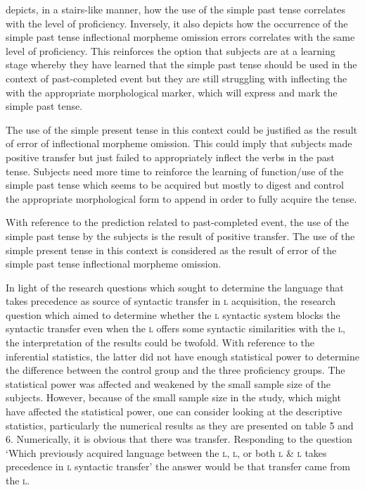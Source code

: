 \documentclass[output=paper,
modfonts
]{langscibook}
\begin{document}
 depicts, in a stairs-like manner, how the use of the simple past tense correlates with the level of proficiency. Inversely, it also depicts how the occurrence of the simple past tense inflectional morpheme omission errors correlates with the same level of proficiency.   This reinforces the option that subjects are at a learning stage whereby they have learned that the simple past tense should be used in the context of past-completed event but they are still struggling with inflecting the  with the appropriate morphological marker, which will express and mark the simple past tense.  

The use of the simple present tense in this context could be justified as the result of error of inflectional morpheme omission. This could imply that subjects made positive transfer but just failed to appropriately inflect the verbs in the past tense. Subjects need more time to reinforce the learning of function/use of the simple past tense which seems to be acquired but mostly to digest and control the appropriate morphological form to append in order to fully acquire the tense.

With reference to the prediction related to past-completed event, the use of the simple past tense by the subjects is the result of positive transfer. The use of the simple present tense in this context is considered as the result of error of the simple past tense inflectional morpheme omission.

\largerpage
In light of the research questions which sought to determine the language that takes precedence as source of syntactic transfer in \textsc{l} acquisition, the research question which aimed to determine whether the \textsc{l} syntactic system blocks the syntactic transfer even when the \textsc{l} offers some syntactic similarities with the \textsc{l}, the interpretation of the results could be twofold. With reference to the inferential statistics, the latter did not have enough statistical power to determine the difference between the control group and the three proficiency groups. The statistical power was affected and weakened by the small sample size of the subjects.  However, because of the small sample size in the study, which might have affected the statistical power, one can consider looking at the descriptive statistics, particularly the numerical results as they are presented on table 5 and 6. Numerically, it is obvious that there was transfer. Responding to the question ‘Which previously acquired language between the \textsc{l}, \textsc{l}, or both \textsc{l} \& \textsc{l} takes precedence in \textsc{l} syntactic transfer’ the answer would be that transfer came from the \textsc{l}. 
\end{document}
